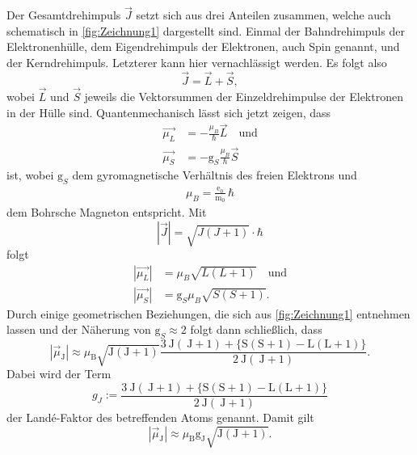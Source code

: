 Der Gesamtdrehimpuls $\vec{J}$ setzt sich aus drei Anteilen zusammen, welche auch schematisch in \autoref{fig:Zeichnung1} dargestellt sind.
Einmal der Bahndrehimpuls der Elektronenhülle, dem Eigendrehimpuls der Elektronen, auch Spin genannt, und der Kerndrehimpuls.
Letzterer kann hier vernachlässigt werden.
Es folgt also
\begin{equation}
    \vec{J} = \vec{L} + \vec{S},
\end{equation}
wobei $\vec{L}$ und $\vec{S}$ jeweils die Vektorsummen der Einzeldrehimpulse der Elektronen in der Hülle sind.
Quantenmechanisch lässt sich jetzt zeigen, dass
\begin{align}
    \vec{\mu_L} &= - \frac{\mu_B}{\hbar} \vec{L} \quad \text{und} \\
    \vec{\mu_S} &= - \text{g}_S \frac{\mu_B}{\hbar} \vec{S}
\end{align}
ist, wobei $\text{g}_S$ dem gyromagnetische Verhältnis des freien Elektrons und 
\begin{align*}
    \mu_B = \frac{\text{e}_0}{\text{m}_0} \, \hbar
\end{align*}
dem Bohrsche Magneton entspricht.
Mit
\begin{equation*}
    \left| \vec{J}\right| = \sqrt{J \left( J + 1 \right)} \cdot \hbar
\end{equation*}
folgt 
\begin{align}
    \left|\vec{\mu_L} \right| &= \mu_B \sqrt{L \left( L + 1 \right)} \quad \text{und} \\
    \left|\vec{\mu_S} \right| &= \text{g}_S \mu_B \sqrt{S \left( S + 1 \right)}.
\end{align}
Durch einige geometrischen Beziehungen, die sich aus \autoref{fig:Zeichnung1} entnehmen lassen und der Näherung von $\text{g}_S \approx 2$ folgt dann schließlich, dass
\begin{equation}
    \left|\vec{\mu}_{\mathrm{J}}\right| \approx \mu_{\mathrm{B}} \sqrt{\mathrm{J}(\mathrm{J}+1)} \frac{3 \mathrm{~J}(\mathrm{~J}+1)+\{\mathrm{S}(\mathrm{S}+1)-\mathrm{L}(\mathrm{L}+1)\}}{2 \mathrm{~J}(\mathrm{~J}+1)} .
\end{equation}
Dabei wird der Term
\begin{equation}
    g_{J}:=\frac{3 \mathrm{~J}(\mathrm{~J}+1)+\{\mathrm{S}(\mathrm{S}+1)-\mathrm{L}(\mathrm{L}+1)\}}{2 \mathrm{~J}(\mathrm{~J}+1)}
\end{equation}
der Landé-Faktor des betreffenden Atoms genannt. Damit gilt
\begin{equation}
    \left|\vec{\mu}_{\mathrm{J}}\right| \approx \mu_{\mathrm{B}} \mathrm{g}_{\mathrm{J}} \sqrt{\mathrm{J}(\mathrm{J}+1)}.
\end{equation}
